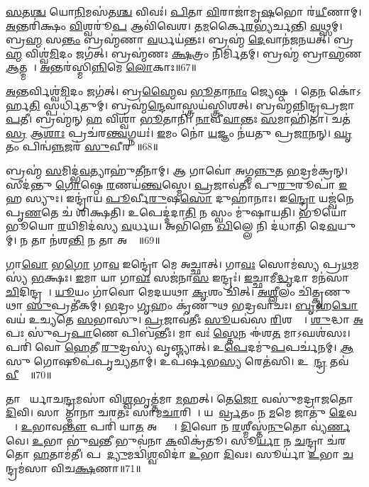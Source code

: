 \ul{𑌸}𑌤\ul{𑌶𑍍𑌚} 𑌯𑍋\ul{𑌨𑌿}𑌮𑌸॑𑌤\ul{𑌶𑍍𑌚} 𑌵𑌿𑌵𑌃॑।
\ul{𑌪𑌿}𑌤𑌾 \ul{𑌵𑌿}𑌰𑌾𑌜𑌾॑𑌮𑍃\ul{𑌷}𑌭𑍋 𑌰॑\ul{𑌯𑍀}𑌣𑌾𑌮𑍍।
\ul{𑌅}𑌨𑍍𑌤𑌰𑌿॑𑌕𑍍𑌷𑌂 \ul{𑌵𑌿}𑌶𑍍𑌵𑌰𑍂॑\ul{𑌪} 𑌆𑌵𑌿॑𑌵𑍇𑌶।
𑌤\ul{𑌮}𑌰𑍍𑌕𑍈\ul{𑌰}𑌭𑍍𑌯॑𑌰𑍍𑌚𑌨𑍍𑌤𑌿 \ul{𑌵}𑌥𑍍𑌸𑌮𑍍।
𑌬𑍍𑌰\ul{𑌹𑍍𑌮} 𑌸\ul{𑌨𑍍𑌤𑌂} 𑌬𑍍𑌰𑌹𑍍𑌮॑𑌣𑌾 \ul{𑌵}𑌰𑍍𑌧𑌯॑𑌨𑍍𑌤𑌃।
𑌬𑍍𑌰𑌹𑍍𑌮॑ \ul{𑌦𑍇}𑌵𑌾𑌨॑𑌜𑌨𑌯𑌤𑍍।
𑌬𑍍𑌰\ul{𑌹𑍍𑌮} 𑌵𑌿𑌶𑍍𑌵॑\ul{𑌮𑌿}𑌦𑌂 𑌜𑌗॑𑌤𑍍।
𑌬𑍍𑌰𑌹𑍍𑌮॑𑌣𑌃 \ul{𑌕𑍍𑌷}𑌤𑍍𑌰𑌂 𑌨𑌿𑌰𑍍𑌮𑌿॑𑌤𑌮𑍍।
𑌬𑍍𑌰𑌹𑍍𑌮॑ 𑌬𑍍𑌰𑌾\ul{𑌹𑍍𑌮}𑌣 \ul{𑌆}𑌤𑍍𑌮𑌨𑌾᳚।
\ul{𑌅}𑌨𑍍𑌤𑌰॑𑌸𑍍𑌮𑌿\ul{𑌨𑍍𑌨𑌿}𑌮𑍇 \ul{𑌲𑍋}𑌕𑌾𑌃॥67॥

\ul{𑌅}𑌨𑍍𑌤𑌰𑍍𑌵𑌿𑌶𑍍𑌵॑\ul{𑌮𑌿}𑌦𑌂 𑌜𑌗॑𑌤𑍍।
𑌬𑍍𑌰\ul{𑌹𑍍𑌮𑍈}𑌵 \ul{𑌭𑍂}𑌤𑌾\ul{𑌨𑌾𑌂} 𑌜𑍍𑌯𑍇𑌷𑍍𑌠𑌮𑍍᳚।
𑌤𑍇\ul{𑌨} 𑌕𑍋॑\-𑌽𑌰𑍍\mbox{}𑌹\ul{𑌤𑌿} 𑌸𑍍𑌪𑌰𑍍𑌧𑌿॑𑌤𑍁𑌮𑍍।
𑌬𑍍𑌰𑌹𑍍𑌮॑\ul{𑌨𑍍𑌦𑍇}𑌵𑌾𑌸𑍍𑌤𑍍𑌰𑌯॑𑌸𑍍𑌤𑍍𑌰𑌿𑌶𑌤𑍍।
𑌬𑍍𑌰𑌹𑍍𑌮॑𑌨𑍍𑌨𑌿𑌨𑍍𑌦𑍍𑌰𑌪𑍍𑌰𑌜𑌾\ul{𑌪}𑌤𑍀।
𑌬𑍍𑌰𑌹𑍍𑌮॑𑌨𑍍 \ul{𑌹} 𑌵𑌿𑌶𑍍𑌵𑌾॑ \ul{𑌭𑍂}𑌤𑌾𑌨𑌿॑।
\ul{𑌨𑌾}𑌵𑍀\ul{𑌵𑌾}𑌨𑍍𑌤𑌃 \ul{𑌸}𑌮𑌾𑌹𑌿॑𑌤𑌾।
𑌚𑌤॑\ul{𑌸𑍍𑌰} 𑌆\ul{𑌶𑌾𑌃} 𑌪𑍍𑌰𑌚॑𑌰\ul{𑌨𑍍𑌤𑍍𑌵}𑌗𑍍𑌨𑌯𑌃॑।
\ul{𑌇}𑌮𑌂 𑌨𑍋॑ \ul{𑌯}𑌜𑍍𑌞𑌂 𑌨॑𑌯𑌤𑍁 𑌪𑍍𑌰\ul{𑌜𑌾}𑌨𑌨𑍍।
\ul{𑌘𑍃}𑌤𑌂 𑌪𑌿𑌨𑍍𑌵॑\ul{𑌨𑍍𑌨}𑌜𑌰॑ \ul{𑌸𑍁}𑌵𑍀𑌰𑌮𑍍᳚॥68॥

𑌬𑍍𑌰𑌹𑍍𑌮॑ \ul{𑌸}𑌮𑌿𑌦𑍍𑌭॑\ul{𑌵}𑌤𑍍𑌯𑌾𑌹𑍁॑𑌤𑍀𑌨𑌾𑌮𑍍।
𑌆 𑌗𑌾𑌵𑍋॑ 𑌅𑌗𑍍𑌮\ul{𑌨𑍍𑌨𑍁}𑌤 \ul{𑌭}𑌦𑍍𑌰𑌮॑𑌕𑍍𑌰𑌨𑍍।
𑌸𑍀𑌦॑𑌨𑍍𑌤𑍁 \ul{𑌗𑍋}𑌷𑍍𑌠𑍇 \ul{𑌰}𑌣𑌯॑\ul{𑌨𑍍𑌤𑍍𑌵}𑌸𑍍𑌮𑍇।
\ul{𑌪𑍍𑌰}𑌜𑌾𑌵॑𑌤𑍀𑌃 𑌪𑍁\ul{𑌰𑍁}𑌰𑍂𑌪𑌾॑ \ul{𑌇}𑌹 𑌸𑍍𑌯𑍁𑌃।
𑌇𑌨𑍍𑌦𑍍𑌰𑌾॑𑌯 \ul{𑌪𑍂}𑌰𑍍𑌵𑍀\ul{𑌰𑍁}𑌷\ul{𑌸𑍋} 𑌦𑍁𑌹𑌾॑𑌨𑌾𑌃।
𑌇\ul{𑌨𑍍𑌦𑍍𑌰𑍋} 𑌯𑌜𑍍𑌵॑𑌨𑍇 𑌪𑍃\ul{𑌣}𑌤𑍇 𑌚॑ 𑌶𑌿𑌕𑍍𑌷𑌤𑌿।
𑌉𑌪𑍇𑌦𑍍𑌦॑𑌦𑌾\ul{𑌤𑌿} 𑌨 𑌸𑍍𑌵𑌂 𑌮𑍁॑𑌷𑌾𑌯𑌤𑌿।
𑌭𑍂𑌯𑍋॑𑌭𑍂𑌯𑍋 \ul{𑌰}𑌯𑌿𑌮𑌿𑌦॑𑌸𑍍𑌯 \ul{𑌵}𑌰𑍍𑌧𑌯\sn{}।
𑌅𑌭𑌿॑𑌨𑍍𑌨𑍇 \ul{𑌖𑌿}𑌲𑍍𑌲𑍇 𑌨𑌿 𑌦॑𑌧𑌾𑌤𑌿 𑌦𑍇\ul{𑌵}𑌯𑍁𑌮𑍍।
𑌨 𑌤𑌾 𑌨॑𑌶\ul{𑌨𑍍𑌤𑌿} 𑌨 𑌤𑌾 𑌅𑌰𑍍𑌵𑌾᳚॥69॥

𑌗𑌾\ul{𑌵𑍋} 𑌭\ul{𑌗𑍋} 𑌗𑌾\ul{𑌵} 𑌇𑌨𑍍𑌦𑍍𑌰𑍋॑ 𑌮𑍇 𑌅𑌚𑍍𑌛𑌾𑌤𑍍।
𑌗𑌾\ul{𑌵𑌃} 𑌸𑍋𑌮॑𑌸𑍍𑌯 𑌪𑍍𑌰\ul{𑌥}𑌮𑌸𑍍𑌯॑ \ul{𑌭}𑌕𑍍𑌷𑌃।
\ul{𑌇}𑌮𑌾 𑌯𑌾 𑌗𑌾\ul{𑌵𑌃} 𑌸𑌜॑𑌨𑌾\ul{𑌸} 𑌇𑌨𑍍𑌦𑍍𑌰𑌃॑।
\ul{𑌇}𑌚𑍍𑌛𑌾𑌮𑍀\ul{𑌦𑍍𑌧𑍃}𑌦𑌾 𑌮𑌨॑𑌸𑌾 \ul{𑌚𑌿}𑌦𑌿𑌨𑍍𑌦𑍍𑌰𑌮𑍍᳚।
\ul{𑌯𑍂}𑌯𑌂 𑌗𑌾॑𑌵𑍋 𑌮𑍇𑌦𑌯𑌥𑌾 \ul{𑌕𑍃}𑌶𑌂 𑌚𑌿॑𑌤𑍍।
\ul{𑌅}\ul{𑌶𑍍𑌲𑍀}𑌲𑌂 𑌚𑌿॑𑌤𑍍𑌕𑍃𑌣𑍁𑌥𑌾 \ul{𑌸𑍁}𑌪𑍍𑌰𑌤𑍀॑𑌕𑌮𑍍।
\ul{𑌭}𑌦𑍍𑌰𑌂 \ul{𑌗𑍃}𑌹𑌂 𑌕𑍃॑𑌣𑍁𑌥 𑌭𑌦𑍍𑌰𑌵𑌾𑌚𑌃।
\ul{𑌬𑍃}𑌹\ul{𑌦𑍍𑌵𑍋} 𑌵𑌯॑ 𑌉𑌚𑍍𑌯𑌤𑍇 \ul{𑌸}𑌭𑌾𑌸𑍁॑।
\ul{𑌪𑍍𑌰}𑌜𑌾𑌵॑𑌤𑍀𑌃 \ul{𑌸𑍂}𑌯𑌵॑𑌸 \ul{𑌰𑌿}𑌶𑌨𑍍𑌤𑍀𑌃᳚।
\ul{𑌶𑍁}𑌦𑍍𑌧𑌾 \ul{𑌅}𑌪𑌃 𑌸𑍁॑𑌪𑍍𑌰\ul{𑌪𑌾}𑌣𑍇 𑌪𑌿𑌬॑𑌨𑍍𑌤𑍀𑌃।
𑌮𑌾 𑌵𑌃॑ \ul{𑌸𑍍𑌤𑍇}𑌨 𑌈॑𑌶\ul{𑌤} 𑌮𑌾𑌽𑌘𑌶॑𑌸𑌃।
𑌪𑌰𑌿॑ 𑌵𑍋 \ul{𑌹𑍇}𑌤𑍀 \ul{𑌰𑍁}𑌦𑍍𑌰𑌸𑍍𑌯॑ 𑌵𑍃𑌞𑍍𑌜𑍍𑌯𑌾𑌤𑍍।
𑌉\ul{𑌪𑍇}𑌦𑌮𑍁॑\ul{𑌪}𑌪𑌰𑍍𑌚॑𑌨𑌮𑍍।
\ul{𑌆}𑌸𑍁 𑌗𑍋𑌷𑍂𑌪॑𑌪𑍃𑌚𑍍𑌯𑌤𑌾𑌮𑍍।
𑌉𑌪॑𑌰𑍍\mbox{}\ul{𑌷}𑌭\ul{𑌸𑍍𑌯} 𑌰𑍇𑌤॑𑌸𑌿।
𑌉𑌪𑍇᳚\ul{𑌨𑍍𑌦𑍍𑌰} 𑌤𑌵॑ \ul{𑌵𑍀}𑌰𑍍𑌯𑍇᳚॥70॥\anuvakamend[\ul{𑌚}\ul{𑌰𑌾}\ul{𑌮𑌿} 𑌕𑌨𑍀॑\ul{𑌯𑍋}\-𑌽𑌨𑍍𑌯𑌾𑌨𑌰𑍍𑌪𑌿॑𑌤𑌾 \ul{𑌪}𑌦𑌾\ul{𑌨𑌿} 𑌯𑌜𑍍𑌵॑𑌸𑍁 𑌹𑌵𑌾𑌮𑌹𑍇 \ul{𑌵𑌿}𑌷𑍍𑌠𑌾 \ul{𑌲𑍋}𑌕𑌾𑌃 \ul{𑌸𑍁}𑌵𑍀\ul{𑌰}𑌮\ul{𑌰𑍍𑌵𑌾} 𑌪𑌿𑌬॑\ul{𑌨𑍍𑌤𑍀𑌃} 𑌷𑌟𑍍𑌚॑]

𑌤𑌾 𑌸𑍂᳚𑌰𑍍𑌯𑌾𑌚\ul{𑌨𑍍𑌦𑍍𑌰}𑌮𑌸𑌾॑ 𑌵𑌿\ul{𑌶𑍍𑌵}𑌭𑍃𑌤𑍍𑌤॑𑌮𑌾 \ul{𑌮}𑌹𑌤𑍍।
𑌤𑍇\ul{𑌜𑍋} 𑌵𑌸𑍁॑𑌮𑌦𑍍𑌰𑌾𑌜𑌤𑍋 \ul{𑌦𑌿}𑌵𑌿।
𑌸𑌾𑌮𑌾᳚𑌤𑍍𑌮𑌾𑌨𑌾 𑌚𑌰𑌤𑌃 𑌸𑌾𑌮\ul{𑌚𑌾}𑌰𑌿𑌣𑌾᳚।
𑌯𑌯𑍋᳚\ul{𑌰𑍍𑌵𑍍𑌰}𑌤𑌂 𑌨 \ul{𑌮}𑌮𑍇 𑌜𑌾𑌤𑍁॑ \ul{𑌦𑍇}𑌵𑌯𑍋𑌃᳚।
\ul{𑌉}𑌭𑌾𑌵\ul{𑌨𑍍𑌤𑍗} 𑌪𑌰𑌿॑ 𑌯𑌾\ul{𑌤} 𑌅𑌰𑍍𑌮𑍍𑌯𑌾᳚।
\ul{𑌦𑌿}𑌵𑍋 𑌨 \ul{𑌰}𑌶𑍍𑌮𑍀𑌸𑍍𑌤॑\ul{𑌨𑍁}𑌤𑍋 𑌵𑍍𑌯॑\ul{𑌰𑍍𑌣}𑌵𑍇।
\ul{𑌉}𑌭𑌾 𑌭𑍁॑\ul{𑌵}𑌨𑍍𑌤𑍀 𑌭𑍁𑌵॑𑌨𑌾 \ul{𑌕}𑌵𑌿𑌕𑍍𑌰॑𑌤𑍂।
𑌸𑍂\ul{𑌰𑍍𑌯𑌾} 𑌨 \ul{𑌚}𑌨𑍍𑌦𑍍𑌰𑌾 𑌚॑𑌰𑌤𑍋 \ul{𑌹}𑌤𑌾𑌮॑𑌤𑍀।
𑌪𑌤𑍀᳚ \ul{𑌦𑍍𑌯𑍁}𑌮𑌦𑍍𑌵𑌿॑\ul{𑌶𑍍𑌵}𑌵𑌿𑌦𑌾॑ \ul{𑌉}𑌭𑌾 \ul{𑌦𑌿}𑌵𑌃।
𑌸𑍂𑌰𑍍𑌯𑌾॑ \ul{𑌉}𑌭𑌾 \ul{𑌚}𑌨𑍍𑌦𑍍𑌰𑌮॑𑌸𑌾 𑌵𑌿𑌚\ul{𑌕𑍍𑌷}𑌣𑌾॥71॥

